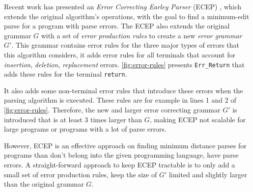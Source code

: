  Recent work has presented an \emph{Error
Correcting Earley Parser} (ECEP) \citep{?}, which extends the original
algorithm's operations, with the goal to find a minimum-edit parse for a program
with parse errors. The ECEP also extends the original grammar $G$ with a set of
\emph{error production rules} to create a new \emph{error grammar} $G'$. This
grammar contains error rules for the three major types of errors that this
algorithm considers, \ie it adds error rules for all terminals that account for
\emph{insertion}, \emph{deletion}, \emph{replacement} errors.
\autoref{fig:error-rules} presents \texttt{Err\_Return} that adds these rules
for the terminal \texttt{return}.

It also adds some non-terminal error rules that introduce these errors when the
parsing algorithm is executed. These rules are for example in lines 1 and 2 of
\autoref{fig:error-rules}. Therefore, the new and larger error correcting
grammar $G'$ is introduced that is at least 3 times larger than $G$, making ECEP
not scalable for large programs or programs with a lot of parse errors.

However, ECEP is an effective approach on finding minimum distance parses for
programs than don't belong into the given programming language, \ie have parse
errors. A straight-forward approach to keep ECEP tractable is to only add a
small set of error production rules, \ie keep the size of $G'$ limited and
slightly larger than the original grammar $G$.





